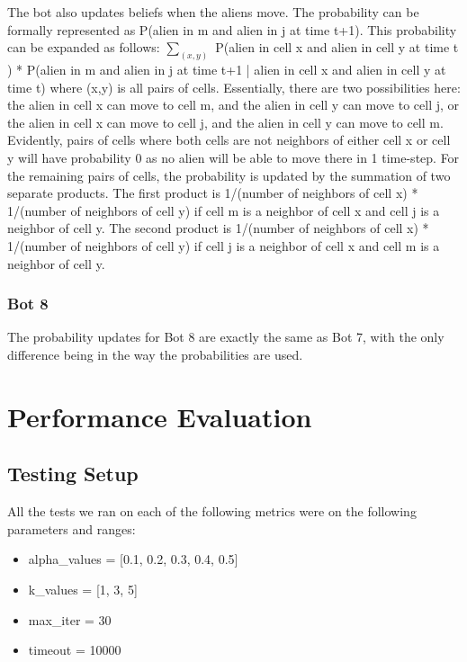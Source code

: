 \documentclass[11pt]{article}
\begin{document}
The bot also updates beliefs when the aliens move. The probability can be formally represented as P(alien in m and alien in j at time t+1). This probability can be expanded as follows: $\sum_{(x,y) }$ P(alien in cell x and alien in cell y at time t ) * P(alien in m and alien in j at time t+1 | alien in cell x and alien in cell y at time t) where (x,y) is all pairs of cells. Essentially, there are two possibilities here: the alien in cell x can move to cell m, and the alien in cell y can move to cell j, or the alien in cell x can move to cell j, and the alien in cell y can move to cell m. Evidently, pairs of cells where both cells are not neighbors of either cell x or cell y will have probability 0 as no alien will be able to move there in 1 time-step. For the remaining pairs of cells, the probability is updated by the summation of two separate products. The first product is 1/(number of neighbors of cell x) * 1/(number of neighbors of cell y) if cell m is a neighbor of cell x and cell j is a neighbor of cell y. The second product is 1/(number of neighbors of cell x) * 1/(number of neighbors of cell y) if cell j is a neighbor of cell x and cell m is a neighbor of cell y. 


\subsubsection{Bot 8}

The probability updates for Bot 8 are exactly the same as Bot 7, with the only difference being in the way the probabilities are used.

\section{Performance Evaluation}

\subsection{Testing Setup}

All the tests we ran on each of the following metrics were on the following parameters and ranges:

\begin{itemize}
    \item alpha\_values = [0.1, 0.2, 0.3, 0.4, 0.5]
    \item k\_values = [1, 3, 5]
    \item max\_iter = 30
    \item timeout = 10000
\end{itemize}
\end{document}

